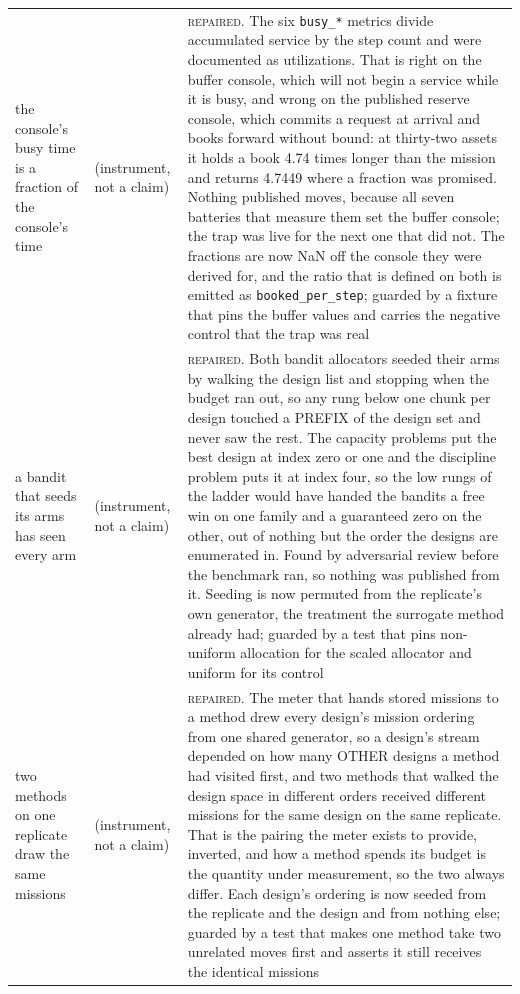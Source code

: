 \begin{tabular}{@{}p{}p{}p{}@{}}
the console's busy time is a fraction of the console's time & (instrument, not a claim) & \textsc{repaired}. The six \texttt{busy\_*} metrics divide accumulated service by the step count and were documented as utilizations. That is right on the buffer console, which will not begin a service while it is busy, and wrong on the published reserve console, which commits a request at arrival and books forward without bound: at thirty-two assets it holds a book 4.74 times longer than the mission and returns 4.7449 where a fraction was promised. Nothing published moves, because all seven batteries that measure them set the buffer console; the trap was live for the next one that did not. The fractions are now NaN off the console they were derived for, and the ratio that is defined on both is emitted as \texttt{booked\_per\_step}; guarded by a fixture that pins the buffer values and carries the negative control that the trap was real \\
a bandit that seeds its arms has seen every arm & (instrument, not a claim) & \textsc{repaired}. Both bandit allocators seeded their arms by walking the design list and stopping when the budget ran out, so any rung below one chunk per design touched a PREFIX of the design set and never saw the rest. The capacity problems put the best design at index zero or one and the discipline problem puts it at index four, so the low rungs of the ladder would have handed the bandits a free win on one family and a guaranteed zero on the other, out of nothing but the order the designs are enumerated in. Found by adversarial review before the benchmark ran, so nothing was published from it. Seeding is now permuted from the replicate's own generator, the treatment the surrogate method already had; guarded by a test that pins non-uniform allocation for the scaled allocator and uniform for its control \\
two methods on one replicate draw the same missions & (instrument, not a claim) & \textsc{repaired}. The meter that hands stored missions to a method drew every design's mission ordering from one shared generator, so a design's stream depended on how many OTHER designs a method had visited first, and two methods that walked the design space in different orders received different missions for the same design on the same replicate. That is the pairing the meter exists to provide, inverted, and how a method spends its budget is the quantity under measurement, so the two always differ. Each design's ordering is now seeded from the replicate and the design and from nothing else; guarded by a test that makes one method take two unrelated moves first and asserts it still receives the identical missions \\

\end{tabular}

